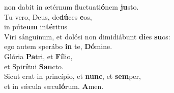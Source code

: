 \oddverse non dabit in ætérnum fluctuati\textbf{ó}nem \textbf{ju}sto.\\
\evenverse Tu vero, Deus, de\textbf{dú}ces \textbf{e}os,~\*\\
\evenverse in púte\textbf{um} in\textbf{té}ritus\\
\oddverse Viri sánguinum, et dolósi non dimidiábunt \textbf{di}es \textbf{su}os:~\*\\
\oddverse ego autem sperábo \textbf{in} te, \textbf{Dó}mine.\\
\evenverse Glória \textbf{Pa}tri, et \textbf{Fí}lio,~\*\\
\evenverse et Spi\textbf{rí}tui \textbf{San}cto.\\
\oddverse Sicut erat in princípio, et \textbf{nunc}, et \textbf{sem}per,~\*\\
\oddverse et in sǽcula sæcu\textbf{ló}rum. \textbf{A}men.\\

